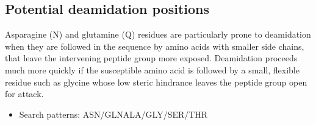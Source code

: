 \documentclass[letterpaper,10pt,english]{jupyterBook}
\begin{document}
\subsection{Potential deamidation positions}
\label{\detokenize{ipynb/chapter1:potential-deamidation-positions}}
\sphinxAtStartPar
Asparagine (N) and glutamine (Q) residues are particularly prone to deamidation when they are followed in the sequence by amino acids with smaller side chains, that leave the intervening peptide group more exposed. Deamidation proceeds much more quickly if the susceptible amino acid is followed by a small, flexible residue such as glycine whose low steric hindrance leaves the peptide group open for attack.
\begin{itemize}
\item {} 
\sphinxAtStartPar
Search patterns: ASN/GLN\sphinxhyphen{}ALA/GLY/SER/THR

\end{itemize}
\end{document}

